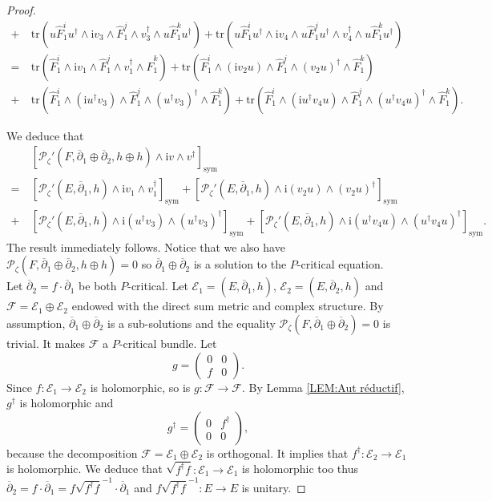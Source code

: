 \documentclass{article}
\theoremstyle{remark}
\theoremstyle{definition}
\newcommand{\tr}{\mathrm{tr}}
\renewcommand{\i}{\boldsymbol{\mathrm{i}}}
\newcommand{\E}{\mathcal{E}}
\newcommand{\F}{\mathcal{F}}
\newcommand{\mP}{\mathcal{P}}
\newcommand{\dbar}{\overline{\partial}}
\newcommand{\sym}{\mathrm{sym}}
\begin{document}
\begin{proof}
\begin{align*}
    +\ & \tr(u\hat{F}_1^iu^\dagger \wedge \i v_3 \wedge \hat{F}_1^j \wedge v_3^\dagger \wedge u\hat{F}_1^ku^\dagger) + \tr(u\hat{F}_1^iu^\dagger \wedge \i v_4 \wedge u\hat{F}_1^ju^\dagger \wedge v_4^\dagger \wedge u\hat{F}_1^ku^\dagger)\\
    =\ & \tr(\hat{F}_1^i \wedge \i v_1 \wedge \hat{F}_1^j \wedge v_1^\dagger \wedge \hat{F}_1^k) + \tr(\hat{F}_1^i \wedge (\i v_2u) \wedge \hat{F}_1^j \wedge (v_2u)^\dagger \wedge \hat{F}_1^k)\\
    +\ & \tr(\hat{F}_1^i \wedge (\i u^\dagger v_3) \wedge \hat{F}_1^j \wedge (u^\dagger v_3)^\dagger \wedge \hat{F}_1^k) + \tr(\hat{F}_1^i \wedge (\i u^\dagger v_4u) \wedge \hat{F}_1^j \wedge (u^\dagger v_4u)^\dagger \wedge \hat{F}_1^k).
\end{align*}

We deduce that
\begin{align*}
    & [\mP_\zeta'(F,\dbar_1 \oplus \dbar_2,h \oplus h) \wedge \i v \wedge v^\dagger]_\sym\\
    =\ & [\mP_\zeta'(E,\dbar_1,h) \wedge \i v_1 \wedge v_1^\dagger]_\sym + [\mP_\zeta'(E,\dbar_1,h) \wedge \i (v_2u) \wedge (v_2u)^\dagger]_\sym\\
    +\ & [\mP_\zeta'(E,\dbar_1,h) \wedge \i (u^\dagger v_3) \wedge (u^\dagger v_3)^\dagger]_\sym + [\mP_\zeta'(E,\dbar_1,h) \wedge \i (u^\dagger v_4u) \wedge (u^\dagger v_4u)^\dagger]_\sym.
\end{align*}
The result immediately follows. Notice that we also have $\mP_\zeta(F,\dbar_1 \oplus \dbar_2,h \oplus h) = 0$ so $\dbar_1 \oplus \dbar_2$ is a solution to the $P$-critical equation.\\

\noindent{} Let $\dbar_2 = f \cdot \dbar_1$ be both $P$-critical. Let $\E_1 = (E,\dbar_1,h)$, $\E_2 = (E,\dbar_2,h)$ and $\F = \E_1 \oplus \E_2$ endowed with the direct sum metric and complex structure. By assumption, $\dbar_1 \oplus \dbar_2$ is a sub-solutions and the equality $\mP_\zeta(F,\dbar_1 \oplus \dbar_2) = 0$ is trivial. It makes $\F$ a $P$-critical bundle. Let
$$
g =
\begin{pmatrix}
    0 & 0\\
    f & 0
\end{pmatrix}.
$$
Since $f : \E_1 \rightarrow \E_2$ is holomorphic, so is $g : \F \rightarrow \F$. By Lemma \ref{LEM:Aut réductif}, $g^\dagger$ is holomorphic and
$$
g^\dagger =
\begin{pmatrix}
    0 & f^\dagger\\
    0 & 0
\end{pmatrix},
$$
because the decomposition $\F = \E_1 \oplus \E_2$ is orthogonal. It implies that $f^\dagger : \E_2 \rightarrow \E_1$ is holomorphic. We deduce that $\sqrt{f^\dagger f} : \E_1 \rightarrow \E_1$ is holomorphic too thus $\dbar_2 = f \cdot \dbar_1 = f\sqrt{f^\dagger f}^{-1} \cdot \dbar_1$ and $f\sqrt{f^\dagger f}^{-1} : E \rightarrow E$ is unitary.
\end{proof}
\end{document}
